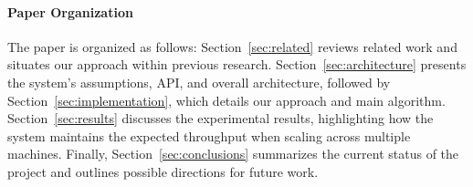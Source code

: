 \paragraph{Paper Organization}
The paper is organized as follows: Section~\ref{sec:related}
reviews related work and situates our approach within previous research.
Section~\ref{sec:architecture} presents the system's assumptions, API, and overall architecture,
followed by Section~\ref{sec:implementation}, which details our approach and main algorithm.
Section~\ref{sec:results} discusses the experimental results,
highlighting how the system maintains the expected throughput when scaling across multiple machines.
Finally, Section~\ref{sec:conclusions} summarizes the current status of the project
and outlines possible directions for future work.
